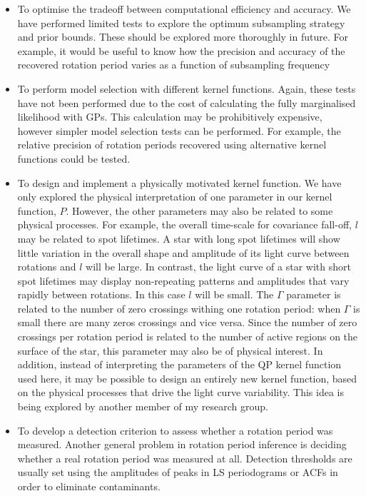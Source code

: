 \begin{itemize}
\item{To optimise the tradeoff between computational efficiency and accuracy.
We have performed limited tests to explore the optimum subsampling strategy
and prior bounds.
These should be explored more thoroughly in future.
For example, it would be useful to know how the precision and accuracy of the
recovered rotation period varies as a function of subsampling frequency}
\item{To perform model selection with different kernel functions. Again, these
tests have not been performed due to the cost of calculating the fully
marginalised likelihood with GPs. This calculation may be prohibitively
expensive, however simpler model selection tests can be performed. For
example, the relative precision of rotation periods recovered using
alternative kernel functions could be tested.}
\item{To design and implement a physically motivated kernel function. We have
only explored the physical interpretation of one parameter in our kernel
function, $P$.
However, the other parameters may also be related to some physical processes.
For example, the overall time-scale for covariance fall-off, $l$ may be
related to spot lifetimes.
A star with long spot lifetimes will show little variation in the overall
shape and amplitude of its light curve between rotations and $l$ will be
large.
In contrast, the light curve of a star with short spot lifetimes may display
non-repeating patterns and amplitudes that vary rapidly between rotations.
In this case $l$ will be small.
The $\Gamma$ parameter is related to the number of zero crossings withing one
rotation period: when $\Gamma$ is small there are many zeros crossings and
vice versa.
Since the number of zero crossings per rotation period is related to the
number of active regions on the surface of the star, this parameter may also
be of physical interest.
In addition, instead of interpreting the parameters of the QP kernel function
used here, it may be possible to design an entirely new kernel function, based
on the physical processes that drive the light curve variability.
This idea is being explored by another member of my research group.}
\item{To develop a detection criterion to assess whether a rotation period was
measured.
Another general problem in rotation period inference is deciding whether a
real rotation period was measured at all.
Detection thresholds are usually set using the amplitudes of peaks in LS
periodograms or ACFs in order to eliminate contaminants.
}
\end{itemize}
